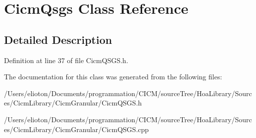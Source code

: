 \hypertarget{class_cicm_qsgs}{\section{Cicm\-Qsgs Class Reference}
\label{class_cicm_qsgs}
}


\subsection{Detailed Description}


Definition at line 37 of file Cicm\-Q\-S\-G\-S.\-h.



The documentation for this class was generated from the following files\-:\begin{DoxyCompactItemize}
\item 
/\-Users/elioton/\-Documents/programmation/\-C\-I\-C\-M/source\-Tree/\-Hoa\-Library/\-Sources/\-Cicm\-Library/\-Cicm\-Granular/Cicm\-Q\-S\-G\-S.\-h\item 
/\-Users/elioton/\-Documents/programmation/\-C\-I\-C\-M/source\-Tree/\-Hoa\-Library/\-Sources/\-Cicm\-Library/\-Cicm\-Granular/Cicm\-Q\-S\-G\-S.\-cpp\end{DoxyCompactItemize}
